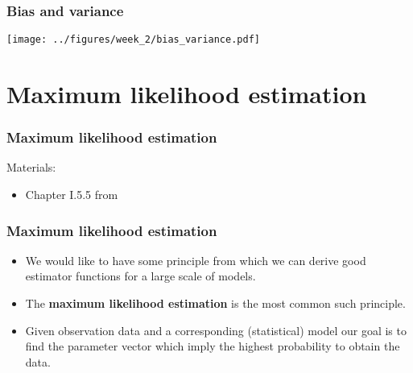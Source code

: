 \documentclass[notes]{beamer}          %
\newif\iffull
\begin{document}
\begin{frame}
\frametitle{Bias and variance}
    \begin{center}
        \texttt{[image: ../figures/week\_2/bias\_variance.pdf]}
    \end{center}
\end{frame}

\iffull
\begin{frame}
\frametitle{Consistency}
    \begin{itemize}
        \item So far we considered fixed size of the training data sets.
        \item We expect that as the number $m$ of training examples grows the estimators will converge to the true value of the parameters.
        \item More formally this is captured in the notion of {\bf consistency}
        $$
        \mbox{plim}_{m \rightarrow \infty} \hat{\theta}_m = \theta
        $$
        where $ \mbox{plim}$ denotes convergence in probability: for any $\epsilon > 0$, $P(\mid \hat{\theta}_m - \theta \mid > \epsilon) \rightarrow 0$ as $m \rightarrow \infty$.
        \item For consistent models the bias decreases as $m$ increases, however a decreasing bias (when $m$ increases) does not imply consistency.
    \end{itemize}
\end{frame}
\fi

\section{Maximum likelihood estimation}

\begin{frame}
\frametitle{Maximum likelihood estimation}
Materials:
\begin{itemize}
    \item Chapter I.5.5 from \cite{deeplearning}
\end{itemize}
\end{frame}

\begin{frame}
\frametitle{Maximum likelihood estimation}
    \begin{itemize}
        \item We would like to have some principle from which we can derive good estimator functions for a large scale of models.
        \item The {\bf maximum likelihood estimation} is the most common such principle.
        \item Given observation data and a corresponding (statistical) model our goal is to find the parameter vector which imply the highest probability to obtain the data.
    \end{itemize}
\end{frame}
\end{document}
